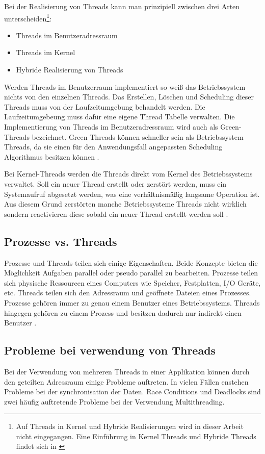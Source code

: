 Bei der Realisierung von Threads kann man prinzipiell zwischen drei Arten unterscheiden\footnote{Auf Threads in Kernel und Hybride Realisierungen wird in dieser Arbeit nicht eingegangen. Eine Einführung in Kernel Threads und Hybride Threads findet sich in \cite[p. 109-110]{tan09}}:

\begin{itemize}
  \item Threads im Benutzeradressraum
  \item Threads im Kernel 
  \item Hybride Realisierung von Threads
\end{itemize}

Werden Threads im Benutzerraum implementiert so weiß das Betriebssystem nichts von den einzelnen Threads. Das Erstellen, Löschen und Scheduling dieser Threads muss von der Laufzeitumgebung  behandelt werden. Die Laufzeitumgebeung muss dafür eine eigene Thread Tabelle verwalten. Die Implementierung von Threads im Benutzeradressraum wird auch als Green-Threads bezeichnet. Green Threads können schneller sein als Betriebssystem Threads, da sie einen für den Anwendungsfall angepassten Scheduling Algorithmus besitzen können \cite[p. 106-108]{tan09}.

Bei Kernel-Threads werden die Threads direkt vom Kernel des Betriebssystems verwaltet. Soll ein neuer Thread erstellt oder zerstört werden, muss ein Systemaufruf abgesetzt werden, was eine verhältnismäßig langsame Operation ist. Aus diesem Grund zerstörten manche Betriebssysteme Threads nicht wirklich sondern reactivieren diese sobald ein neuer Thread erstellt werden soll \cite[p. 106-108]{tan09}.


\subsection{Prozesse vs. Threads}

Prozesse und Threads teilen sich einige Eigenschaften. Beide Konzepte bieten die Möglichkeit Aufgaben parallel oder pseudo parallel zu bearbeiten. Prozesse teilen sich physische Ressourcen eines Computers wie Speicher, Festplatten, I/O Geräte, etc. Threads teilen sich den Adressraum und geöffnete Dateien eines Prozesses. Prozesse gehören immer zu genau einem Benutzer eines Betriebssystems. Threads hingegen gehören zu einem Prozess und besitzen dadurch nur indirekt einen Benutzer \cite[p. 89]{tan09}. 


\subsection{Probleme bei verwendung von Threads}
Bei der Verwendung von mehreren Threads in einer Applikation können durch den geteilten Adressraum einige Probleme auftreten. In vielen Fällen enstehen Probleme bei der synchronisation der Daten. Race Conditions und Deadlocks sind zwei häufig auftretende Probleme bei der Verwendung  Multithreading. 

